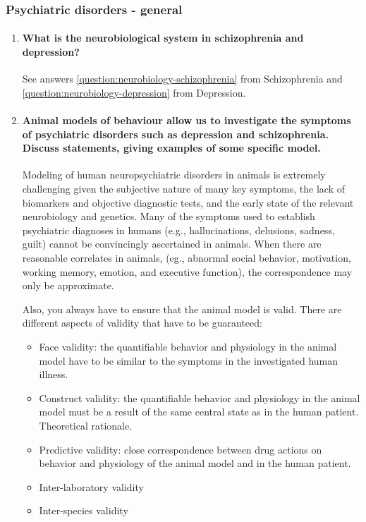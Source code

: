 \documentclass[12pt,article,oneside,a4paper]{memoir}
\begin{document}
\subsubsection{Psychiatric disorders - general}
\begin{enumerate}
\item \paragraph{What is the neurobiological system in schizophrenia and depression?}
See answers \ref{question:neurobiology-schizophrenia} from Schizophrenia and
\ref{question:neurobiology-depression} from Depression.

\item \paragraph{Animal models of behaviour allow us to investigate the
symptoms of psychiatric disorders such as depression and schizophrenia. Discuss
statements, giving examples of some specific model.}

Modeling of human neuropsychiatric disorders in animals is extremely
challenging given the subjective nature of many key symptoms, the lack of
biomarkers and objective diagnostic tests, and the early state of the relevant
neurobiology and genetics. Many of the symptoms used to establish psychiatric
diagnoses in humans (e.g., hallucinations, delusions, sadness, guilt) cannot be
convincingly ascertained in animals. When there are reasonable correlates in
animals, (eg., abnormal social behavior, motivation, working memory, emotion,
and executive function), the correspondence may only be approximate.

Also, you always have to ensure that the animal model is valid. There are
different aspects of validity that have to be guaranteed:
\begin{itemize}
\item Face validity: the quantifiable behavior and physiology in the animal
model have to be similar to the symptoms in the investigated human illness.
\item Construct validity: the quantifiable behavior and physiology in the
animal model must be a result of the same central state as in the human
patient. Theoretical rationale.
\item Predictive validity: close correspondence between drug actions on
behavior and physiology of the animal model and in the human patient.
\item Inter-laboratory validity
\item Inter-species validity
\end{itemize}


\end{enumerate}
\end{document}

